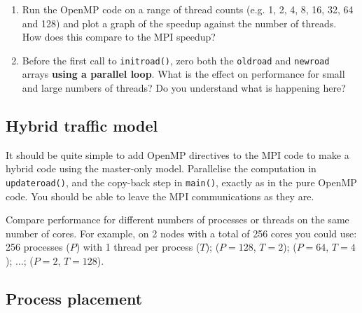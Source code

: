 \documentclass{article}
\begin{document}
\begin{enumerate}

\item Run the OpenMP code on a range of thread counts (e.g. 1, 2, 4,
  8, 16, 32, 64 and 128) and plot a graph of the speedup against the
  number of threads. How does this compare to the MPI speedup?


\item Before the first call to \verb+initroad()+, zero both the
  \verb+oldroad+ and \verb+newroad+ arrays {\bf using a parallel
    loop}. What is the effect on performance for small and large
  numbers of threads? Do you understand what is happening here?


\end{enumerate}

\subsection{Hybrid traffic model}

It should be quite simple to add OpenMP directives to the MPI code to
make a hybrid code using the master-only model. Parallelise the
computation in \verb+updateroad()+, and the copy-back step in
\verb+main()+, exactly as in the pure OpenMP code. You should be able
to leave the MPI communications as they are.

Compare performance for different numbers of processes or threads on
the same number of cores. For example, on 2 nodes with a total of 256
cores you could use: 256 processes ($P$) with 1 thread per process
($T$); ($P=128$, $T=2$); ($P=64$, $T=4$); $\ldots$; ($P=2$, $T=128$).

\subsection{Process placement}
\end{document}
